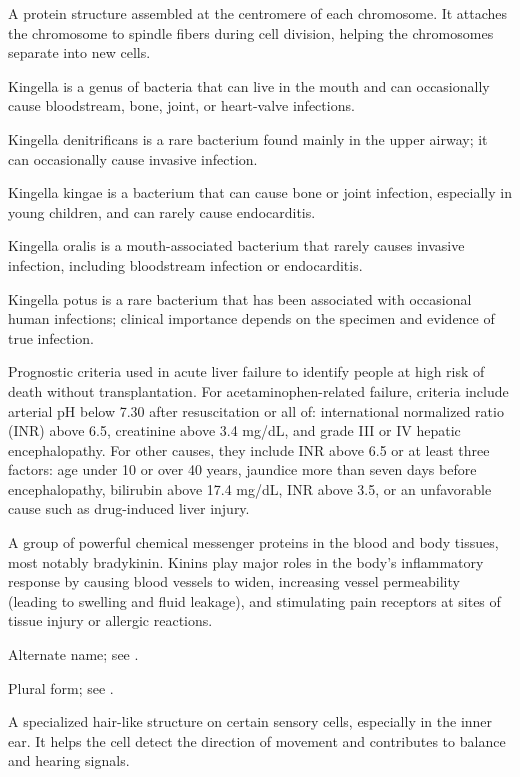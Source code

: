  A protein structure assembled at the centromere of each chromosome. It attaches the chromosome to spindle fibers during cell division, helping the chromosomes separate into new cells.

 Kingella is a genus of bacteria that can live in the mouth and can occasionally cause bloodstream, bone, joint, or heart-valve infections.

 Kingella denitrificans is a rare bacterium found mainly in the upper airway; it can occasionally cause invasive infection.

 Kingella kingae is a bacterium that can cause bone or joint infection, especially in young children, and can rarely cause endocarditis.

 Kingella oralis is a mouth-associated bacterium that rarely causes invasive infection, including bloodstream infection or endocarditis.

 Kingella potus is a rare bacterium that has been associated with occasional human infections; clinical importance depends on the specimen and evidence of true infection.

 Prognostic criteria used in acute liver failure to identify people at high risk of death without transplantation. For acetaminophen-related failure, criteria include arterial pH below 7.30 after resuscitation or all of: international normalized ratio (INR) above 6.5, creatinine above 3.4 mg/dL, and grade III or IV hepatic encephalopathy. For other causes, they include INR above 6.5 or at least three factors: age under 10 or over 40 years, jaundice more than seven days before encephalopathy, bilirubin above 17.4 mg/dL, INR above 3.5, or an unfavorable cause such as drug-induced liver injury.

 A group of powerful chemical messenger proteins in the blood and body tissues, most notably bradykinin. Kinins play major roles in the body's inflammatory response by causing blood vessels to widen, increasing vessel permeability (leading to swelling and fluid leakage), and stimulating pain receptors at sites of tissue injury or allergic reactions.

 Alternate name; see .

 Plural form; see .

 A specialized hair-like structure on certain sensory cells, especially in the inner ear. It helps the cell detect the direction of movement and contributes to balance and hearing signals.

